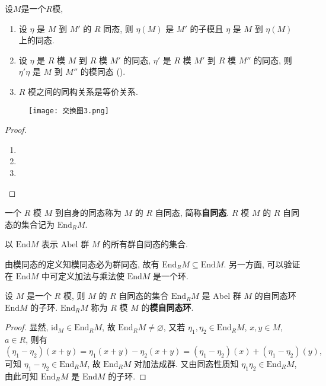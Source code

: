 \documentclass[../../main.tex]{subfiles}
\begin{document}
\begin{theorem}
设$M$是一个$R$模,
\begin{enumerate}
\item 设 \( \eta \) 是 \( M \) 到 \( M' \) 的 \( R \) 同态, 则 \( \eta(M) \) 是 \( M' \) 的子模且 \( \eta \) 是 \( M \) 到 \( \eta(M) \) 上的同态.

\item 设 \( \eta \) 是 \( R \) 模 \( M \) 到 \( R \) 模 \( M' \) 的同态, \( \eta' \) 是 \( R \) 模 \( M' \) 到 \( R \) 模 \( M'' \) 的同态, 则 \( \eta'\eta \) 是 \( M \) 到 \( M'' \) 的模同态 ().

\item \( R \) 模之间的同构关系是等价关系.
\end{enumerate}
\end{theorem}
\begin{figure}[H]
\centering
\texttt{[image: 交换图3.png]}
\caption{}
\label{figure:交换图3}
\end{figure}
\begin{proof}
\begin{enumerate}
\item 

\item 

\item 
\end{enumerate}
\end{proof}

\begin{definition}
一个 \( R \) 模 \( M \) 到自身的同态称为 \( M \) 的 \( R \) 自同态, 简称\textbf{自同态}. \( R \) 模 \( M \) 的 \( R \) 自同态的集合记为 \( \text{End}_R M \). 

以 \( \text{End}M \) 表示 Abel 群 \( M \) 的所有群自同态的集合.
\end{definition}
\begin{remark}
由模同态的定义知模同态必为群同态, 故有 \( \text{End}_R M \subseteq \text{End}M \). 另一方面, 可以验证在 \( \text{End}M \) 中可定义加法与乘法使 \( \text{End}M \) 是一个环. 
\end{remark}

\begin{theorem}\label{theorem:抽象代数-定理 1.6.2}
设 \( M \) 是一个 \( R \) 模, 则 \( M \) 的 \( R \) 自同态的集合 \( \text{End}_R M \) 是 Abel 群 \( M \) 的自同态环 \( \text{End}M \) 的子环. \( \text{End}_R M \) 称为 \( R \) 模 \( M \) 的\textbf{模自同态环}.
\end{theorem}
\begin{proof}
显然, \( \text{id}_M \in \text{End}_R M \), 故 \( \text{End}_R M \neq \varnothing \), 又若 \( \eta_1, \eta_2 \in \text{End}_R M \), \( x, y \in M \), \( a \in R \), 则有
\[
(\eta_1 - \eta_2)(x + y) = \eta_1(x + y) - \eta_2(x + y) = (\eta_1 - \eta_2)(x) + (\eta_1 - \eta_2)(y),
\]
可知 \( \eta_1 - \eta_2 \in \text{End}_R M \), 故 \( \text{End}_R M \) 对加法成群. 又由同态性质知 \( \eta_1\eta_2 \in \text{End}_R M \), 由此可知 \( \text{End}_R M \) 是 \( \text{End}M \) 的子环.
\end{proof}
\end{document}
